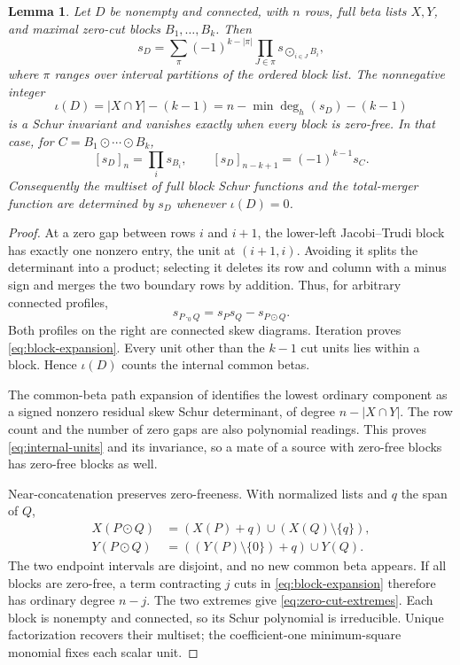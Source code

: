 \documentclass[11pt,a4paper]{amsart}
\numberwithin{equation}{section}
\theoremstyle{plain}
\newtheorem{lemma}[theorem]{Lemma}
\theoremstyle{definition}
\begin{document}
\begin{lemma}\label{lem:zero-cut-data}
Let \(D\) be nonempty and connected, with \(n\) rows, full beta lists \(X,Y\), and maximal zero-cut blocks \(B_1,\ldots,B_k\).  Then
\begin{equation}\label{eq:block-expansion}
 s_D=\sum_\pi(-1)^{k-|\pi|}
       \prod_{J\in\pi}s_{\bigodot_{i\in J}B_i},
\end{equation}
where \(\pi\) ranges over interval partitions of the ordered block list.  The nonnegative integer
\begin{equation}\label{eq:internal-units}
 \iota(D)=|X\cap Y|-(k-1)
         =n-\min\deg_h(s_D)-(k-1)
\end{equation}
is a Schur invariant and vanishes exactly when every block is zero-free.  In that case, for \(C=B_1\odot\cdots\odot B_k\),
\begin{equation}\label{eq:zero-cut-extremes}
 [s_D]_n=\prod_i s_{B_i},\qquad
 [s_D]_{n-k+1}=(-1)^{k-1}s_C.
\end{equation}
Consequently the multiset of full block Schur functions and the total-merger function are determined by \(s_D\) whenever \(\iota(D)=0\).
\end{lemma}
\begin{proof}
At a zero gap between rows \(i\) and \(i+1\), the lower-left Jacobi--Trudi block has exactly one nonzero entry, the unit at \((i+1,i)\).  Avoiding it splits the determinant into a product; selecting it deletes its row and column with a minus sign and merges the two boundary rows by addition.  Thus, for arbitrary connected profiles,
\[
 s_{P\cdot_0Q}=s_Ps_Q-s_{P\odot Q}.
\]
Both profiles on the right are connected skew diagrams.  Iteration proves \eqref{eq:block-expansion}.  Every unit other than the \(k-1\) cut units lies within a block.  Hence \(\iota(D)\) counts the internal common betas.

The common-beta path expansion of \cite{Shields2026Cofactor} identifies the lowest ordinary component as a signed nonzero residual skew Schur determinant, of degree \(n-|X\cap Y|\).  The row count and the number of zero gaps are also polynomial readings.  This proves \eqref{eq:internal-units} and its invariance, so a mate of a source with zero-free blocks has zero-free blocks as well.

Near-concatenation preserves zero-freeness.  With normalized lists and \(q\) the span of \(Q\),
\[
 \begin{aligned}
 X(P\odot Q)&=(X(P)+q)\cup(X(Q)\setminus\{q\}),\\
 Y(P\odot Q)&=((Y(P)\setminus\{0\})+q)\cup Y(Q).
 \end{aligned}
\]
The two endpoint intervals are disjoint, and no new common beta appears.  If all blocks are zero-free, a term contracting \(j\) cuts in \eqref{eq:block-expansion} therefore has ordinary degree \(n-j\).  The two extremes give \eqref{eq:zero-cut-extremes}.  Each block is nonempty and connected, so its Schur polynomial is irreducible.  Unique factorization recovers their multiset; the coefficient-one minimum-square monomial fixes each scalar unit.
\end{proof}
\end{document}
